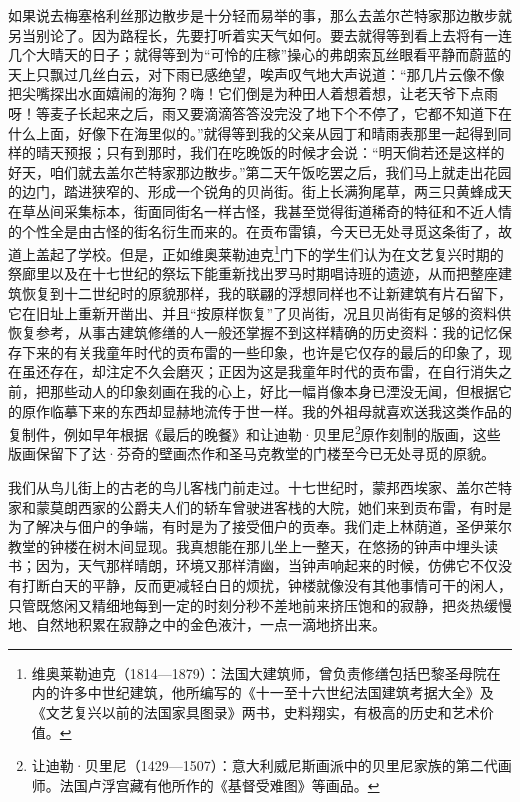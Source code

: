 \par 如果说去梅塞格利丝那边散步是十分轻而易举的事，那么去盖尔芒特家那边散步就另当别论了。因为路程长，先要打听着实天气如何。要去就得等到看上去将有一连几个大晴天的日子；就得等到为“可怜的庄稼”操心的弗朗索瓦丝眼看平静而蔚蓝的天上只飘过几丝白云，对下雨已感绝望，唉声叹气地大声说道：“那几片云像不像把尖嘴探出水面嬉闹的海狗？嗨！它们倒是为种田人着想着想，让老天爷下点雨呀！等麦子长起来之后，雨又要滴滴答答没完没了地下个不停了，它都不知道下在什么上面，好像下在海里似的。”就得等到我的父亲从园丁和晴雨表那里一起得到同样的晴天预报；只有到那时，我们在吃晚饭的时候才会说：“明天倘若还是这样的好天，咱们就去盖尔芒特家那边散步。”第二天午饭吃罢之后，我们马上就走出花园的边门，踏进狭窄的、形成一个锐角的贝尚街。街上长满狗尾草，两三只黄蜂成天在草丛间采集标本，街面同街名一样古怪，我甚至觉得街道稀奇的特征和不近人情的个性全是由古怪的街名衍生而来的。在贡布雷镇，今天已无处寻觅这条街了，故道上盖起了学校。但是，正如维奥莱勒迪克\footnote{维奥莱勒迪克（1814—1879）：法国大建筑师，曾负责修缮包括巴黎圣母院在内的许多中世纪建筑，他所编写的《十一至十六世纪法国建筑考据大全》及《文艺复兴以前的法国家具图录》两书，史料翔实，有极高的历史和艺术价值。}门下的学生们认为在文艺复兴时期的祭廊里以及在十七世纪的祭坛下能重新找出罗马时期唱诗班的遗迹，从而把整座建筑恢复到十二世纪时的原貌那样，我的联翩的浮想同样也不让新建筑有片石留下，它在旧址上重新开凿出、并且“按原样恢复”了贝尚街，况且贝尚街有足够的资料供恢复参考，从事古建筑修缮的人一般还掌握不到这样精确的历史资料：我的记忆保存下来的有关我童年时代的贡布雷的一些印象，也许是它仅存的最后的印象了，现在虽还存在，却注定不久会磨灭；正因为这是我童年时代的贡布雷，在自行消失之前，把那些动人的印象刻画在我的心上，好比一幅肖像本身已湮没无闻，但根据它的原作临摹下来的东西却显赫地流传于世一样。我的外祖母就喜欢送我这类作品的复制件，例如早年根据《最后的晚餐》和让迪勒·贝里尼\footnote{让迪勒·贝里尼（1429—1507）：意大利威尼斯画派中的贝里尼家族的第二代画师。法国卢浮宫藏有他所作的《基督受难图》等画品。}原作刻制的版画，这些版画保留下了达·芬奇的壁画杰作和圣马克教堂的门楼至今已无处寻觅的原貌。
\par 我们从鸟儿街上的古老的鸟儿客栈门前走过。十七世纪时，蒙邦西埃家、盖尔芒特家和蒙莫朗西家的公爵夫人们的轿车曾驶进客栈的大院，她们来到贡布雷，有时是为了解决与佃户的争端，有时是为了接受佃户的贡奉。我们走上林荫道，圣伊莱尔教堂的钟楼在树木间显现。我真想能在那儿坐上一整天，在悠扬的钟声中埋头读书；因为，天气那样晴朗，环境又那样清幽，当钟声响起来的时候，仿佛它不仅没有打断白天的平静，反而更减轻白日的烦扰，钟楼就像没有其他事情可干的闲人，只管既悠闲又精细地每到一定的时刻分秒不差地前来挤压饱和的寂静，把炎热缓慢地、自然地积累在寂静之中的金色液汁，一点一滴地挤出来。
